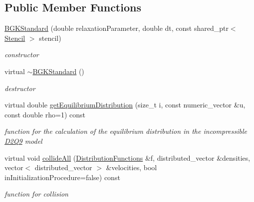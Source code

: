 \subsection*{Public Member Functions}
\begin{DoxyCompactItemize}
\item 
\hypertarget{classnatrium_1_1BGKStandard_a47cd5ef20c46be121f2e2306f2e6b05b}{
\hyperlink{classnatrium_1_1BGKStandard_a47cd5ef20c46be121f2e2306f2e6b05b}{BGKStandard} (double relaxationParameter, double dt, const shared\_\-ptr$<$ \hyperlink{classnatrium_1_1Stencil}{Stencil} $>$ stencil)}
\label{classnatrium_1_1BGKStandard_a47cd5ef20c46be121f2e2306f2e6b05b}

\begin{DoxyCompactList}\small\item\em constructor \item\end{DoxyCompactList}\item 
virtual \hyperlink{classnatrium_1_1BGKStandard_aa55035be79098a762cf4f0ef308d41e5}{$\sim$BGKStandard} ()
\begin{DoxyCompactList}\small\item\em destructor \item\end{DoxyCompactList}\item 
virtual double \hyperlink{classnatrium_1_1BGKStandard_a3d45ef2fe5536bf14914f99297477754}{getEquilibriumDistribution} (size\_\-t i, const numeric\_\-vector \&u, const double rho=1) const 
\begin{DoxyCompactList}\small\item\em function for the calculation of the equilibrium distribution in the incompressible \hyperlink{classnatrium_1_1D2Q9}{D2Q9} model \item\end{DoxyCompactList}\item 
virtual void \hyperlink{classnatrium_1_1BGKStandard_a58ffede8b7587e584875ab8e4279fcac}{collideAll} (\hyperlink{classnatrium_1_1DistributionFunctions}{DistributionFunctions} \&f, distributed\_\-vector \&densities, vector$<$ distributed\_\-vector $>$ \&velocities, bool inInitializationProcedure=false) const 
\begin{DoxyCompactList}\small\item\em function for collision \item\end{DoxyCompactList}\end{DoxyCompactItemize}


